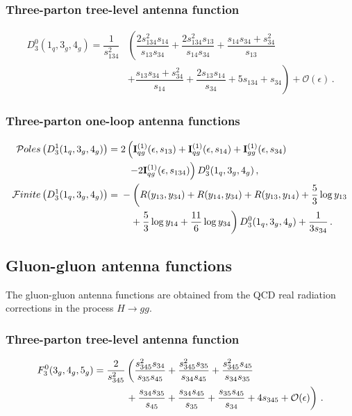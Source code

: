 \documentclass[main.tex]{subfiles}
\begin{document}
    \subsubsection{Three-parton tree-level antenna function}
    \begin{equation}\label{eqn:D30}
        \begin{split}
        D_{3}^{0}(1_{q},3_{g},4_{g}) = \dfrac{1}{s_{134}^{2}}&\left(\dfrac{2s_{134}^{2}s_{14}}{s_{13}s_{34}} + \dfrac{2s_{134}^{2}s_{13}}{s_{14}s_{34}} + \dfrac{s_{14}s_{34}+s_{34}^{2}}{s_{13}}\right. \\
        & \left. + \dfrac{s_{13}s_{34}+s_{34}^{2}}{s_{14}} + \dfrac{2s_{13}s_{14}}{s_{34}} + 5s_{134} + s_{34}\right) + \mathcal{O}(\epsilon) \, .
        \end{split}
    \end{equation}
    \subsubsection{Three-parton one-loop antenna functions}
    \begin{align}\label{eqn:D31}
        \mathcal{P}oles\left(D_{3}^{1}(1_{q},3_{g},4_{g})\right) =& \; 2\left(\mathbf{I}_{qg}^{(1)}(\epsilon, s_{13}) + \mathbf{I}_{qg}^{(1)}(\epsilon, s_{14}) + \mathbf{I}_{gg}^{(1)}(\epsilon, s_{34}) \right. \nonumber \\
        &\left. \quad -2\mathbf{I}_{qg}^{(1)}(\epsilon, s_{134}) \vphantom{\mathbf{I}_{gg}^{(1)}} \right) D_{3}^{0}(1_{q},3_{g},4_{g}) \, , \\
        \mathcal{F}inite\left(D_{3}^{1}(1_{q},3_{g},4_{g})\right) =& \; -\left(R(y_{13},y_{34})+R(y_{14},y_{34})+R(y_{13},y_{14}) + \dfrac{5}{3}\log{y_{13}}\nonumber \right. \\
        &\left. \vphantom{\dfrac{1}{1}} \quad + \dfrac{5}{3}\log{y_{14}} + \dfrac{11}{6}\log{y_{34}}\right) D_{3}^{0}(1_{q},3_{g},4_{g}) + \dfrac{1}{3s_{34}} \, .
    \end{align}

    \subsection{Gluon-gluon antenna functions}
    The gluon-gluon antenna functions are obtained from the
    QCD real radiation corrections in the process $H \rightarrow g g$.
    \subsubsection{Three-parton tree-level antenna function}
    \begin{align}\label{eqn:F30}
        F_{3}^{0}(3_{g},4_{g},5_{g}) =& \; \dfrac{2}{s_{345}^{2}}\left(\dfrac{s_{345}^{2}s_{34}}{s_{35}s_{45}} + \dfrac{s_{345}^{2}s_{35}}{s_{34}s_{45}} + \dfrac{s_{345}^{2}s_{45}}{s_{34}s_{35}} \right. \nonumber \\
        &\left. \vphantom{\dfrac{s_{345}^{2}s_{34}}{s_{35}s_{45}}} \quad \quad +\dfrac{s_{34}s_{35}}{s_{45}} + \dfrac{s_{34}s_{45}}{s_{35}} + \dfrac{s_{35}s_{45}}{s_{34}} + 4s_{345} + \mathcal{O}(\epsilon) \right) \, .
    \end{align}
\end{document}
